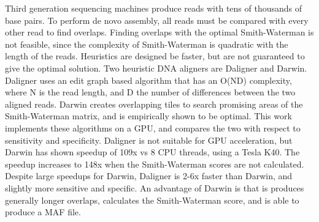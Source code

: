 
Third generation sequencing machines produce reads with tens of thousands of base pairs.
To perform de novo assembly, all reads must be compared with every other read to find overlaps.
Finding overlaps with the optimal Smith-Waterman is not feasible, since the complexity of Smith-Waterman is quadratic with the length of the reads.
Heuristics are designed be faster, but are not guaranteed to give the optimal solution.
Two heuristic DNA aligners are Daligner and Darwin.
Daligner uses an edit graph based algorithm that has an O(ND) complexity, where N is the read length, and D the number of differences between the two aligned reads.
Darwin creates overlapping tiles to search promising areas of the Smith-Waterman matrix, and is empirically shown to be optimal.
This work implements these algorithms on a GPU, and compares the two with respect to sensitivity and specificity.
Daligner is not suitable for GPU acceleration, but Darwin has shown speedup of 109x vs 8 CPU threads, using a Tesla K40.
The speedup increases to 148x when the Smith-Waterman scores are not calculated.
Despite large speedups for Darwin, Daligner is 2-6x faster than Darwin, and slightly more sensitive and specific.
An advantage of Darwin is that is produces generally longer overlaps, calculates the Smith-Waterman score, and is able to produce a MAF file.






